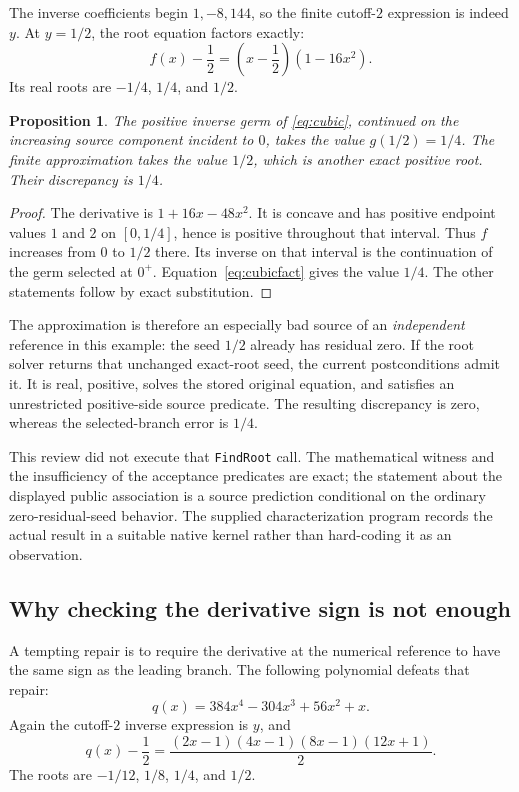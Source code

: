 \documentclass[11pt,letterpaper]{article}
\newcommand{\code}[1]{{\small\nolinkurl{#1}}}
\newtheorem{proposition}{Proposition}[section]
\begin{document}
The inverse coefficients begin $1,-8,144$, so the finite cutoff-$2$ expression is indeed $y$. At $y=1/2$, the root equation factors exactly:
\begin{equation}
 f(x)-\frac12
 =\left(x-\frac12\right)(1-16x^2).
 \label{eq:cubicfact}
\end{equation}
Its real roots are $-1/4$, $1/4$, and $1/2$.

\begin{proposition}
The positive inverse germ of \eqref{eq:cubic}, continued on the increasing source component incident to $0$, takes the value $g(1/2)=1/4$. The finite approximation takes the value $1/2$, which is another exact positive root. Their discrepancy is $1/4$.
\end{proposition}
\begin{proof}
The derivative is $1+16x-48x^2$. It is concave and has positive endpoint values $1$ and $2$ on $[0,1/4]$, hence is positive throughout that interval. Thus $f$ increases from $0$ to $1/2$ there. Its inverse on that interval is the continuation of the germ selected at $0^+$. Equation~\eqref{eq:cubicfact} gives the value $1/4$. The other statements follow by exact substitution.
\end{proof}

The approximation is therefore an especially bad source of an \emph{independent} reference in this example: the seed $1/2$ already has residual zero. If the root solver returns that unchanged exact-root seed, the current postconditions admit it. It is real, positive, solves the stored original equation, and satisfies an unrestricted positive-side source predicate. The resulting discrepancy is zero, whereas the selected-branch error is $1/4$.

This review did not execute that \code{FindRoot} call. The mathematical witness and the insufficiency of the acceptance predicates are exact; the statement about the displayed public association is a source prediction conditional on the ordinary zero-residual-seed behavior. The supplied characterization program records the actual result in a suitable native kernel rather than hard-coding it as an observation.

\subsection{Why checking the derivative sign is not enough}

A tempting repair is to require the derivative at the numerical reference to have the same sign as the leading branch. The following polynomial defeats that repair:
\begin{equation}
 q(x)=384x^4-304x^3+56x^2+x.
 \label{eq:quartic}
\end{equation}
Again the cutoff-$2$ inverse expression is $y$, and
\begin{equation}
 q(x)-\frac12
 =\frac{(2x-1)(4x-1)(8x-1)(12x+1)}2.
 \label{eq:quarticfact}
\end{equation}
The roots are $-1/12$, $1/8$, $1/4$, and $1/2$.
\end{document}
